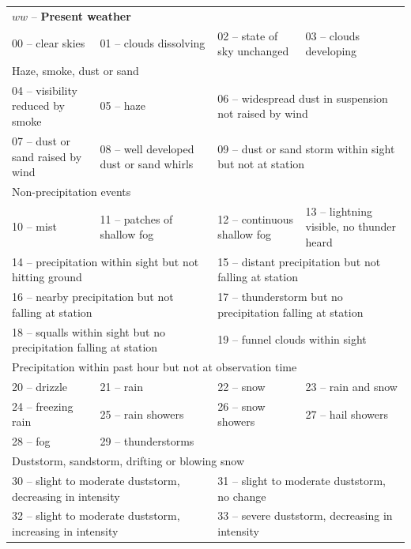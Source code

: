 \documentclass{article}
\begin{document}
\begin{description}
\begin{description}
\begin{landscape}
      \hspace{-8cm}
      {\small
        \begin{tabular}{llll}
          \multicolumn{4}{l}{$ww$ -- \textbf{Present weather}}\\
        00 -- clear skies&01 -- clouds dissolving&02 -- state of sky unchanged&03 -- clouds developing\\
        \multicolumn{4}{l}{Haze, smoke, dust or sand}\\
        04 -- visibility reduced by smoke&05 -- haze&\multicolumn{2}{l}{06 -- widespread dust in suspension not raised by wind}\\
        07 -- dust or sand raised by wind&08 -- well developed dust or sand whirls&\multicolumn{2}{l}{09 -- dust or sand storm within sight but not at station}\\
        \multicolumn{4}{l}{Non-precipitation events}\\
        10 -- mist&11 -- patches of shallow fog&12 -- continuous shallow fog&13 -- lightning visible, no thunder heard\\
        \multicolumn{2}{l}{14 -- precipitation within sight but not hitting ground}&      \multicolumn{2}{l}{15 -- distant precipitation but not falling at station}\\
        \multicolumn{2}{l}{16 -- nearby precipitation but not falling at station}&\multicolumn{2}{l}{17 -- thunderstorm but no precipitation falling at station}\\
        \multicolumn{2}{l}{18 -- squalls within sight but no precipitation falling at station}&\multicolumn{2}{l}{19 -- funnel clouds within sight}\\
        \multicolumn{4}{l}{Precipitation within past hour but not at observation time}\\
        20 -- drizzle&21 -- rain&22 -- snow&23 -- rain and snow\\
        24 -- freezing rain&25 -- rain showers&26 -- snow showers&27 -- hail showers\\
        28 -- fog& 29 -- thunderstorms& & \\
        \multicolumn{4}{l}{Duststorm, sandstorm, drifting or blowing snow}\\
        \multicolumn{2}{l}{30 -- slight to moderate duststorm, decreasing in intensity}&\multicolumn{2}{l}{31 -- slight to moderate duststorm, no change}\\
        \multicolumn{2}{l}{32 -- slight to moderate duststorm, increasing in intensity}&\multicolumn{2}{l}{33 -- severe duststorm, decreasing in intensity}\\

\end{tabular}}
\end{landscape}
\end{description}
\end{description}
\end{document}
